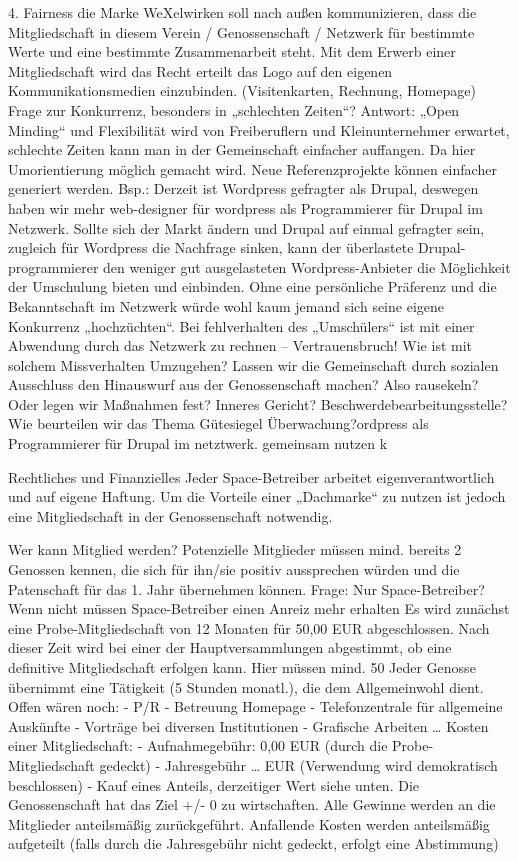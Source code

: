 4. Fairness
die Marke WeXelwirken soll nach außen kommunizieren, dass die Mitgliedschaft in diesem Verein / Genossenschaft / Netzwerk für bestimmte Werte und eine bestimmte Zusammenarbeit steht. 
Mit dem Erwerb einer Mitgliedschaft wird das Recht erteilt das Logo auf den eigenen Kommunikationsmedien einzubinden.
(Visitenkarten, Rechnung, Homepage)
Frage zur Konkurrenz, besonders in „schlechten Zeiten“?
Antwort: „Open Minding“ und Flexibilität wird von Freiberuflern und Kleinunternehmer erwartet, schlechte Zeiten kann man in der Gemeinschaft einfacher auffangen.
Da hier Umorientierung möglich gemacht wird. Neue Referenzprojekte können einfacher generiert werden. 
Bsp.: Derzeit ist Wordpress gefragter als Drupal, deswegen haben wir mehr web-designer für wordpress als Programmierer für Drupal im Netzwerk. Sollte sich der Markt ändern und Drupal auf einmal gefragter sein, zugleich für Wordpress die Nachfrage sinken, kann der überlastete Drupal-programmierer den weniger gut ausgelasteten Wordpress-Anbieter die Möglichkeit der Umschulung bieten und einbinden. 
Ohne eine persönliche Präferenz und die Bekanntschaft im Netzwerk würde wohl kaum jemand sich seine eigene Konkurrenz „hochzüchten“.
Bei fehlverhalten des „Umschülers“ ist mit einer Abwendung durch das Netzwerk zu rechnen – Vertrauensbruch!
Wie ist mit solchem Missverhalten Umzugehen? Lassen wir die Gemeinschaft durch sozialen Ausschluss den Hinauswurf aus der Genossenschaft machen? Also rausekeln?
Oder legen wir Maßnahmen fest? Inneres Gericht? Beschwerdebearbeitungsstelle?
Wie beurteilen wir das Thema Gütesiegel Überwachung?ordpress als Programmierer für Drupal im netztwerk.  gemeinsam nutzen k

Rechtliches und Finanzielles
Jeder Space-Betreiber arbeitet eigenverantwortlich und auf eigene Haftung. 
Um die Vorteile einer „Dachmarke“ zu nutzen ist jedoch eine Mitgliedschaft in der Genossenschaft notwendig.

Wer kann Mitglied werden?
Potenzielle Mitglieder müssen mind. bereits 2 Genossen kennen, die sich für ihn/sie positiv aussprechen würden und die Patenschaft für das 1. Jahr übernehmen können.
Frage: Nur Space-Betreiber? Wenn nicht müssen Space-Betreiber einen Anreiz mehr erhalten
Es wird zunächst eine Probe-Mitgliedschaft von 12 Monaten für 50,00 EUR abgeschlossen. Nach dieser Zeit wird bei einer der Hauptversammlungen abgestimmt, ob eine definitive Mitgliedschaft erfolgen kann. Hier müssen mind. 50%
Jeder Genosse übernimmt eine Tätigkeit (5 Stunden monatl.), die dem Allgemeinwohl dient. Offen wären noch:
- P/R
- Betreuung Homepage
- Telefonzentrale für allgemeine Auskünfte
- Vorträge bei diversen Institutionen
- Grafische Arbeiten
…
Kosten einer Mitgliedschaft:
- Aufnahmegebühr: 0,00 EUR (durch die Probe-Mitgliedschaft gedeckt)
- Jahresgebühr … EUR (Verwendung wird demokratisch beschlossen)
- Kauf eines Anteils, derzeitiger Wert siehe unten.
Die Genossenschaft hat das Ziel +/- 0 zu wirtschaften.
Alle Gewinne werden an die Mitglieder anteilsmäßig zurückgeführt.
Anfallende Kosten werden anteilsmäßig aufgeteilt (falls durch die Jahresgebühr nicht gedeckt, erfolgt eine Abstimmung)

